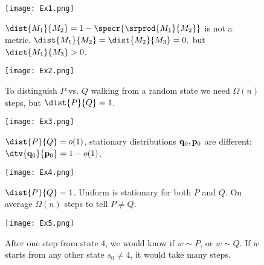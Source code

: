 \begin{figure}[H]
	\centering
		\texttt{[image: Ex1.png]}
		\caption{$\dist{M_1}{M_2}=1-\specr{\srprod{M_1}{M_2}}$ is not a metric. $\dist{M_1}{M_2}=\dist{M_2}{M_3}=0,$ but 
			$\dist{M_1}{M_3}> 0$.}
		\vspace{3ex}
		\label{fig:example1}
	
		\texttt{[image: Ex2.png]}
		\caption{To distinguish $P$ vs. $Q$ walking from a random state we need $\Omega(n)$ steps, but $\dist{P}{Q}=1$.}
		\label{fig:example2}
	\hspace{3pt}
\end{figure}

\begin{figure}[H]
\centering
		\texttt{[image: Ex3.png]}
		\caption{$\dist{P}{Q}=o(1)$, stationary distributions $\mathbf{q}_0,\mathbf{p}_0$ 
			are different: $\dtv{\vect{q}_0}{\vect{p}_0}=1-o(1)$.}
		\label{fig:example3}
	\hspace{3pt}
		\texttt{[image: Ex4.png]}
		\caption{$\dist{P}{Q}=1$. Uniform is stationary	for both $P$ and $Q$. 
			On average $\Omega(n)$ steps to tell $P\neq Q$.}
		\label{fig:example4}
	
	\hspace{5pt}	
		\texttt{[image: Ex5.png]}
		\caption{After one step from state $4$, we would know if $w\sim P$, or $w\sim Q$. 
			If $w$ starts from any other state $s_0\neq 4$, it would take many steps.}
		\vspace{3ex}
		\label{fig:example5}
\end{figure}
	
